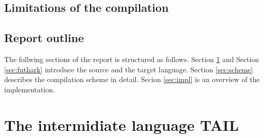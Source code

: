 \documentclass[11pt]{article}
\begin{document}
\subsection{Limitations of the compilation}
% 

\subsection{Report outline}
The follwing sections of the report is structured as follows. Section \ref{sec:tail} and Section \ref{sec:futhark} introduce the source and the target language. Section \ref{sec:scheme} describes the compilation scheme in detail. Secion \ref{sec:impl} is an overview of the implementation.







\section{The intermidiate language TAIL}
\label{sec:tail}
\end{document}
